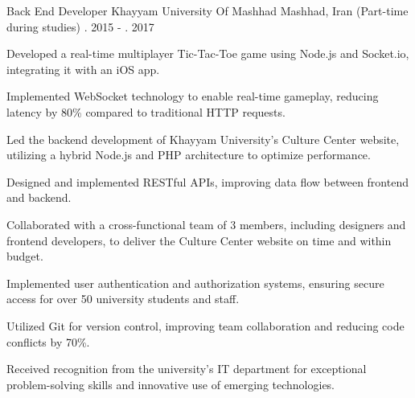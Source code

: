 \begin{cventries}
    \cventry
    {Back End Developer} %
    {Khayyam University Of Mashhad} %
    {Mashhad, Iran (Part-time during studies)} %
    {\shortmonthname[01]. 2015 - \shortmonthname[09]. 2017} %
    {
    	\begin{cvitems} %
    		\item {Developed a real-time multiplayer Tic-Tac-Toe game using Node.js and Socket.io, integrating it with an iOS app.}
    		\item { Implemented WebSocket technology to enable real-time gameplay, reducing latency by 80\% compared to traditional HTTP requests.}
    		\item {Led the backend development of Khayyam University's Culture Center website, utilizing a hybrid Node.js and PHP architecture to optimize performance.}
    		\item {Designed and implemented RESTful APIs, improving data flow between frontend and backend.}
    		\item {Collaborated with a cross-functional team of 3 members, including designers and frontend developers, to deliver the Culture Center website on time and within budget.}
    		\item {Implemented user authentication and authorization systems, ensuring secure access for over 50 university students and staff.}
    		\item{Utilized Git for version control, improving team collaboration and reducing code conflicts by 70\%.}
    		\item{Received recognition from the university's IT department for exceptional problem-solving skills and innovative use of emerging technologies.}
    	\end{cvitems}
    }
\end{cventries}
